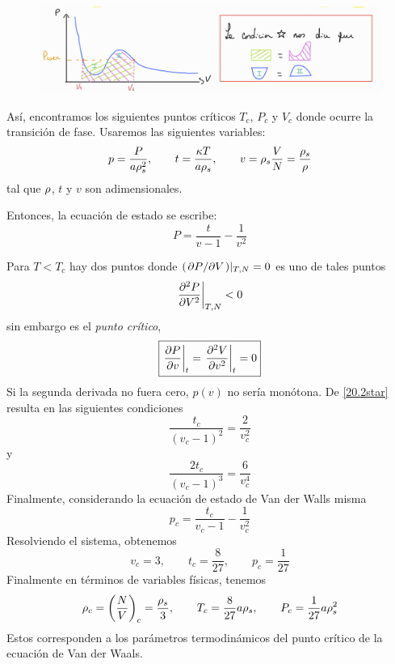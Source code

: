 \begin{figure}[h!]
	\centering
	\includegraphics[scale=0.4]{fig/20-star.png}
\end{figure}

Así, encontramos los siguientes puntos críticos $T_c$, $P_c$ y $V_c$ donde ocurre la transición de fase. Usaremos las siguientes variables:
\begin{equation}
  p=\frac{P}{a\rho_s^2},\qquad t=\frac{\kappa T}{a\rho_s	},\qquad v=\rho_s\frac{V}{N}=\frac{\rho_s}{\rho }
\end{equation}
tal que $\rho$, $t$ y $v$ son adimensionales.

Entonces, la ecuación de estado se escribe:
\begin{equation}
\boxed{  P=\frac{t}{v-1}-\frac{1}{v^2}}
\end{equation}

Para $T<T_c$ hay dos puntos donde $(\pdv*{P}{V})|_{T,N}=0$ es uno de tales puntos
\begin{equation}
\eval{  \pdv[2]{P}{V}}_{T,N}<0
\end{equation}
sin embargo es el \textit{punto crítico},
\begin{equation}\label{20.2star}
\boxed{  \eval{\pdv{P}{v}}_{t}=\eval{\pdv[2]{V}{v}}_t=0}
\end{equation}
Si la segunda derivada no fuera cero, $p(v)$ no sería monótona. De \eqref{20.2star} resulta en las siguientes condiciones
\begin{equation}
  \frac{t_c}{(v_c-1)^2}=\frac{2}{v_c^2}
\end{equation}
y
\begin{equation}
  \frac{2t_c}{(v_c-1)^3}=\frac{6}{v_c^4}
\end{equation}
Finalmente, considerando la ecuación de estado de Van der Walls misma
\begin{equation}
  p_c=\frac{t_c}{v_c-1}-\frac{1}{v_c^2}
\end{equation}
Resolviendo el sistema, obtenemos
\begin{equation}
  v_c=3,\qquad t_c=\frac{8}{27},\qquad p_c=\frac{1}{27}
\end{equation}
Finalmente en términos de variables físicas, tenemos
\begin{equation}
  \rho_c=\left(\frac{N}{V}\right)_c=\frac{\rho_s}{3},\qquad T_c=\frac{8}{27}a\rho_s,\qquad P_c=\frac{1}{27}a\rho_s^2
\end{equation}
Estos corresponden a los parámetros termodinámicos del punto crítico de la ecuación de Van der Waals.

